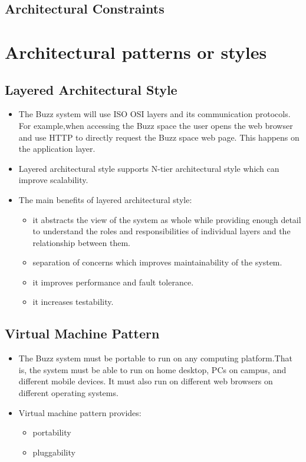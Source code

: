 \documentclass[12pt, oneside]{article}
\begin{document}
	\subsection{Architectural Constraints}		

\section{Architectural patterns or styles}
	\subsection{Layered Architectural Style}
	\begin{itemize}
		\item The Buzz system will use ISO OSI layers and its communication protocols. For example,when accessing the Buzz space the user opens the web browser and use HTTP to directly request the Buzz space web page. This happens on the application layer.
		\item Layered architectural style supports N-tier architectural style which can improve scalability.
		\item The main benefits of layered architectural style:
			\begin{itemize}
			\item it abstracts the view of the system as whole while providing enough detail to understand the roles and responsibilities of individual layers and the relationship between them.
			\item separation of concerns which improves maintainability of the system.
			\item it improves performance and fault tolerance.
			\item it increases testability.
			\end{itemize}
	\end{itemize}
	\subsection{Virtual Machine Pattern}
	\begin{itemize}
		\item The Buzz system must be portable to run on any computing platform.That is, the system must be able to run on home desktop, PCs on campus, and different mobile devices. It must also run on different web browsers on different operating systems.
		\item Virtual machine pattern provides:
		\begin{itemize}
			\item portability
			\item pluggability
		\end{itemize}		 
	\end{itemize}
\end{document}
